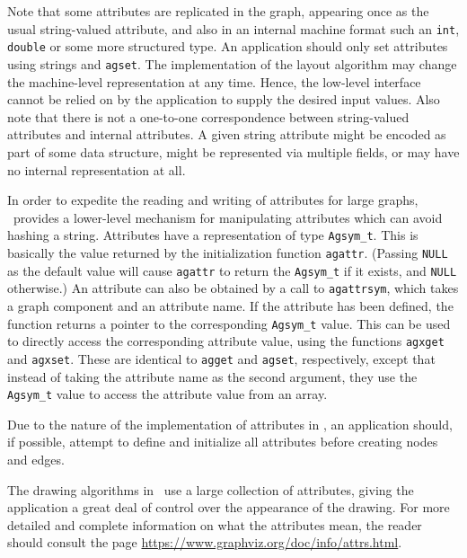 Note that some attributes are replicated in the graph, appearing once
as the usual string-valued attribute, and also in an internal machine
format such an {\tt int}, {\tt double} or some more structured type.
An application should only set attributes using strings and {\tt agset}.
The implementation of the layout algorithm
may change the machine-level representation at any time.
Hence, the low-level
interface cannot be relied on by the application to supply the desired
input values. Also note that there
is not a one-to-one correspondence between string-valued
attributes and internal attributes. A given string attribute might be
encoded as part of some data structure, might be represented via 
multiple fields, or may have no internal representation at all. 

In order to expedite the reading and writing of attributes for large
graphs, \gviz\ provides a lower-level mechanism for manipulating attributes
which can avoid hashing a string.
Attributes have a representation of type \verb+Agsym_t+. This is basically the
value returned by the initialization function {\tt agattr}. (Passing {\tt NULL}
as the default value will cause {\tt agattr} to return the \verb+Agsym_t+ if
it exists, and {\tt NULL} otherwise.)
An attribute can also be obtained by a call to {\tt agattrsym}, which takes
a graph component and an attribute name. If the attribute has been defined,
the function returns a pointer to the corresponding \verb+Agsym_t+ value. 
This can be used to directly access the corresponding attribute value,
using the functions {\tt agxget} and {\tt agxset}. These are identical to 
{\tt agget} and {\tt agset}, respectively, except that instead of
taking the attribute name as the second argument, they use 
the \verb+Agsym_t+ value to access the attribute
value from an array.

Due to the nature of the implementation of attributes in \gviz, an application 
should, if possible, attempt to define and initialize all
attributes before creating nodes and edges.

The drawing algorithms in \gviz\ use a large collection of attributes,
giving the application a great deal of control over the appearance of the
drawing. For more detailed and complete information on what the attributes mean, the
reader should consult the page \url{https://www.graphviz.org/doc/info/attrs.html}.

